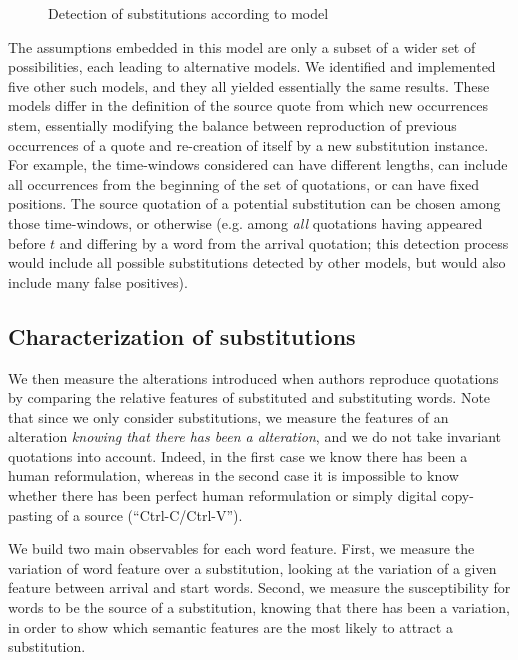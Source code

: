 \begin{figure}[h]
    \centering
    \def\svgwidth{\textwidth}
    \small
    
    \caption{Detection of substitutions according to model }
    \label{fig:model-slidetimebags}
\end{figure}

The assumptions embedded in this model are only a subset of a wider set of possibilities, each leading to alternative models.
We identified and implemented five other such models, and they all yielded essentially the same results.
These models differ in the definition of the source quote from which new occurrences stem, essentially modifying the balance between reproduction of previous occurrences of a quote and re-creation of itself by a new substitution instance.
For example, the time-windows considered can have different lengths, can include all occurrences from the beginning of the set of quotations, or can have fixed positions.
The source quotation of a potential substitution can be chosen among those time-windows, or otherwise (e.g. among \emph{all} quotations having appeared before $t$ and differing by a word from the arrival quotation; this detection process would include all possible substitutions detected by other models, but would also include many false positives).

\subsection{Characterization of substitutions}

We then measure the alterations introduced when authors reproduce quotations by comparing the relative features of substituted and substituting words.
Note that since we only consider substitutions, we measure the features of an alteration \emph{knowing that there has been a alteration}, and we do not take invariant quotations into account.
Indeed, in the first case we know there has been a human reformulation, whereas in the second case it is impossible to know whether there has been perfect human reformulation or simply digital copy-pasting of a source (``{\sc Ctrl-C}/{\sc Ctrl-V}'').

We build two main observables for each word feature.
First, we measure the variation of word feature over a substitution, looking at the variation of a given feature between arrival and start words.
Second, we measure the susceptibility for words to be the source of a substitution, knowing that there has been a variation, in order to show which semantic features are the most likely to attract a substitution.

